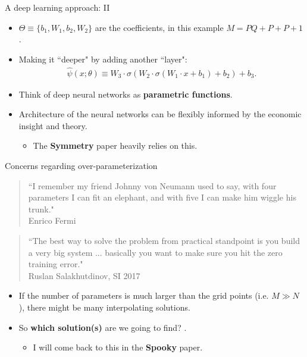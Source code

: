\documentclass[aspectratio=169,10pt]{beamer}
\newcommand{\emphcolor}[1]{\textbf{\textcolor{emphcolorval}{#1}}}
\begin{document}
\begin{frame}{A deep learning approach: II}
	\begin{itemize}

	\item $\Theta \equiv \{b_1,W_1,b_2,W_2\}$ are the coefficients, in this example $M = PQ+P+P+1$.\smallskip
	\item Making it ``deeper" by adding another ``layer":
	\begin{align*}
		\hat{\psi}(x;\theta)\equiv W_3\cdot\sigma(W_2 \cdot \sigma(W_1 \cdot x + b_1) + b_2)+b_3.
	\end{align*}
	\item Think of deep neural networks as \emphcolor{parametric functions}.\smallskip
	\item Architecture of the neural networks can be flexibly informed by the economic insight and theory.\smallskip
	\begin{itemize}
		\item The \emphcolor{Symmetry} paper heavily relies on this.
	\end{itemize}
	\end{itemize}
\end{frame}

\begin{frame}{Concerns regarding over-parameterization}
	\begin{quote}
		``I remember my friend Johnny von Neumann used to say, with four parameters I can fit an elephant, and with five I can make him wiggle his trunk."\\
		\hfill Enrico Fermi
	\end{quote}
	\begin{quote}
		``The best way to solve the problem from practical standpoint is you build a very big system ... basically you want to make sure you hit the zero training error."\\
		\hfill Ruslan Salakhutdinov, SI 2017
	\end{quote}

\begin{itemize}
	\item If the number of parameters is much larger than the grid points (i.e. $M\gg N$), there might be many interpolating solutions.
	\item So \emphcolor{which solution(s)} are we going to find? .
	\begin{itemize}
		\item I will come back to this in the \emphcolor{Spooky} paper.
	\end{itemize}
\end{itemize}

\end{frame}	
\end{document}
